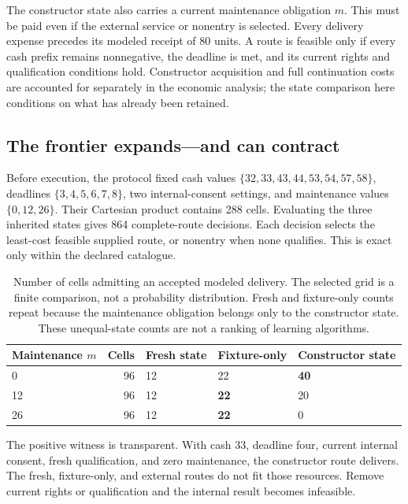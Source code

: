The constructor state also carries a current maintenance obligation $m$. This
must be paid even if the external service or nonentry is selected. Every delivery
expense precedes its modeled receipt of 80 units. A route is feasible only if
every cash prefix remains nonnegative, the deadline is met, and its current
rights and qualification conditions hold. Constructor acquisition and full
continuation costs are accounted for separately in the economic analysis; the
state comparison here conditions on what has already been retained.

\subsection{The frontier expands---and can contract}

Before execution, the protocol fixed cash values
$\{32,33,43,44,53,54,57,58\}$, deadlines $\{3,4,5,6,7,8\}$, two internal-consent
settings, and maintenance values $\{0,12,26\}$. Their Cartesian product contains
288 cells. Evaluating the three inherited states gives 864 complete-route
decisions. Each decision selects the least-cost feasible supplied route, or
nonentry when none qualifies. This is exact only within the declared catalogue.

\begin{table}[htbp]
\centering\small
\begin{tabularx}{\linewidth}{P{.92in}rYYY}
\toprule
Maintenance $m$ & Cells & Fresh state & Fixture-only & Constructor state\\
 & 96 & 12 & 22 & \textbf{40}\\
12 & 96 & 12 & \textbf{22} & 20\\
26 & 96 & 12 & \textbf{22} & 0\\
\bottomrule
\end{tabularx}
\caption{Number of cells admitting an accepted modeled delivery. The selected
grid is a finite comparison, not a probability distribution. Fresh and fixture-only
counts repeat because the maintenance obligation belongs only to the constructor
state. These unequal-state counts are not a ranking of learning algorithms.}
\label{tab:study-frontier}
\end{table}

The positive witness is transparent. With cash 33, deadline four, current internal
consent, fresh qualification, and zero maintenance, the constructor route delivers.
The fresh, fixture-only, and external routes do not fit those resources. Remove
current rights or qualification and the internal result becomes infeasible.

